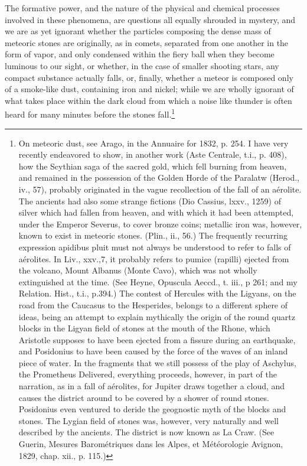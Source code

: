 The formative power, and the nature of the physical and chemical processes involved in these phenomena, are questions all equally shrouded in mystery, and we are as yet ignorant whether the particles composing the dense mass of meteoric stones are originally, as in comets, separated from one another in the form of vapor, and only condensed within the fiery ball when they become luminous to our sight, or whether, in the case of smaller shooting stars, any compact substance actually falls, or, finally, whether a meteor is composed only of a smoke-like dust, containing iron and nickel; while we are wholly ignorant of what takes place within the dark cloud from which a noise like thunder is often heard for many minutes before the stones fall.\footnote{On meteoric dust, see Arago, in the Annuaire for 1832, p. 254. I have very recently endeavored to show, in another work (Aste Centrale, t.i., p. 408), how the Scythian saga of the sacred gold, which fell burning from heaven, and remained in the possession of the Golden Horde of the Paralatw (Herod., iv., 57), probably originated in the vague recollection of the fall of an a\'{e}rolite. The ancients had also some strange fictions (Dio Cassius, lxxv., 1259) of silver which had fallen from heaven, and with which it had been attempted, under the Emperor Severus, to cover bronze coins; metallic iron was, however, known to exist in meteoric stones. (Plin., ii., 56.) The frequently recurring expression apidibus pluit must not always be understood to refer to falls of a\'{e}rolites. In Liv., xxv.,7, it probably refers to pumice (rapilli) ejected from the volcano, Mount Albanus (Monte Cavo), which was not wholly extinguished at the time. (See Heyne, Opuscula Aeccd., t. iii., p 261; and my Relation. Hist., t.i., p.394.) The contest of Hercules with the Ligyans, on the road from the Caucasus to the Hesperides, belongs to a different sphere of ideas, being an attempt to explain mythically the origin of the round quartz blocks in the Ligyan field of stones at the mouth of the Rhone, which Aristotle supposes to have been ejected from a fissure during an earthquake, and Posidonius to have been caused by the force of the waves of an inland piece of water. In the fragments that we still possess of the play of Aschylus, the Prometheus Delivered, everything proceeds, however, in part of the narration, as in a fall of a\'{e}rolites, for Jupiter draws together a cloud, and causes the district around to be covered by a shower of round stones. Posidonius even ventured to deride the geognostic myth of the blocks and stones. The Lygian field of stones was, however, very naturally and well described by the ancients. The district is now known as La Craw. (See Guerin, Mesures Barom\'{e}triques dans les Alpes, et M\'{e}t\'{e}orologie Avignon, 1829, chap. xii., p. 115.)}

